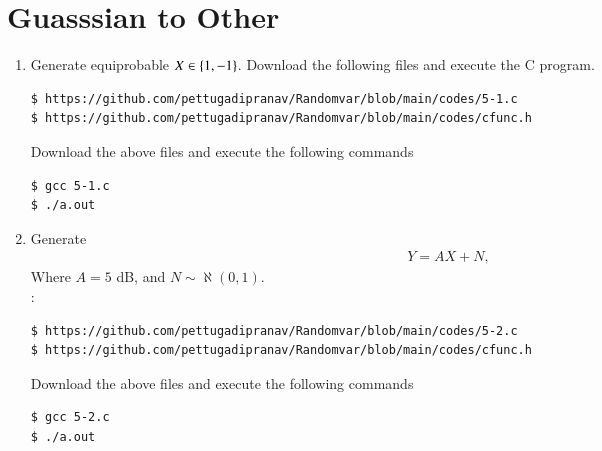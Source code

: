 \documentclass[journal,12pt,twocolumn]{IEEEtran}
\renewcommand\thesection{\arabic{section}}
\begin{document}
\section{Guasssian to Other}
\begin{enumerate}[label=\thesection.\arabic*
,ref=\thesection.\theenumi]
\item Generate equiprobable $X \in \left\{1,-1\right\}$.
\solution Download the following files and execute the  C program.
\begin{lstlisting}
$ https://github.com/pettugadipranav/Randomvar/blob/main/codes/5-1.c
$ https://github.com/pettugadipranav/Randomvar/blob/main/codes/cfunc.h
\end{lstlisting}
Download the above files and execute the following commands
\begin{lstlisting}
$ gcc 5-1.c
$ ./a.out
\end{lstlisting}

\item Generate
\begin{align}
    Y=AX+N,
\end{align}
Where $A=5$ dB, and $N\sim \aleph(0,1)$.\\
\solution:
\begin{lstlisting}
$ https://github.com/pettugadipranav/Randomvar/blob/main/codes/5-2.c
$ https://github.com/pettugadipranav/Randomvar/blob/main/codes/cfunc.h
\end{lstlisting}
Download the above files and execute the following commands
\begin{lstlisting}
$ gcc 5-2.c
$ ./a.out
\end{lstlisting}


\end{enumerate}
\end{document}
